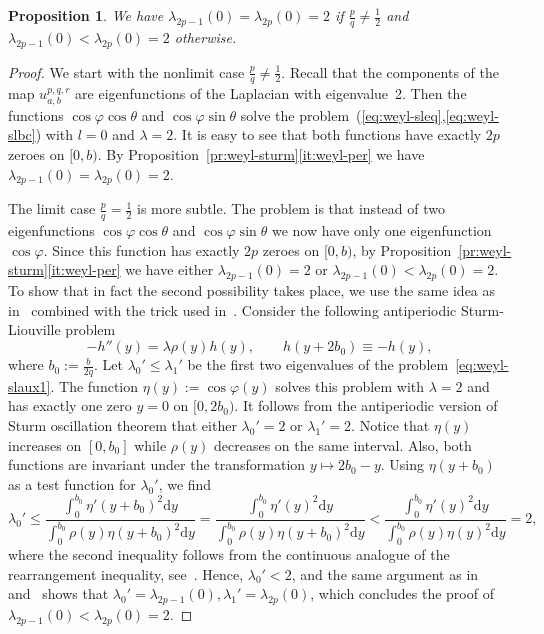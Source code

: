 \documentclass{amsart}
\let\le\leqslant
\let\phi\varphi
\renewcommand{\d}{\mathrm{d}}
\theoremstyle{plain}
\newtheorem{proposition}{Proposition}[section]
\theoremstyle{definition}
\theoremstyle{remark}
\begin{document}
\begin{proposition}\label{pr:weyl-leq0}
We have \(\lambda_{2p-1}(0)=\lambda_{2p}(0)=2\) if \(\frac{p}q\ne\frac{1}2\) and
\(\lambda_{2p-1}(0)<\lambda_{2p}(0)=2\) otherwise.
\end{proposition}

\begin{proof}
We start with the nonlimit case \(\frac{p}q\ne\frac{1}2\). Recall that the
components of the map \(u_{a,b}^{p,q,r}\) are eigenfunctions of the Laplacian
with eigenvalue~2. Then the functions \(\cos\phi\cos\theta\) and
\(\cos\phi\sin\theta\) solve the problem~(\ref{eq:weyl-sleq},\ref{eq:weyl-slbc})
with \(l=0\) and \(\lambda=2\). It is easy to see that both functions have
exactly \(2p\) zeroes on \([0,b)\). By
Proposition~\ref{pr:weyl-sturm}\ref{it:weyl-per} we have
\(\lambda_{2p-1}(0)=\lambda_{2p}(0)=2\).

The limit case \(\frac{p}q=\frac{1}2\) is more subtle. The problem is that
instead of two eigenfunctions \(\cos\phi\cos\theta\) and \(\cos\phi\sin\theta\)
we now have only one eigenfunction \(\cos\phi\). Since this function has exactly
\(2p\) zeroes on \([0,b)\), by Proposition~\ref{pr:weyl-sturm}\ref{it:weyl-per}
we have either \(\lambda_{2p-1}(0)=2\) or
\(\lambda_{2p-1}(0)<\lambda_{2p}(0)=2\). To show that in fact the second
possibility takes place, we use the same idea as in~\cite[sec.~3.3]{Kar2014}
combined with the trick used in~\cite[proof of Proposition~3.12]{Mor2024}.
Consider the following antiperiodic Sturm-Liouville problem
\begin{equation}\label{eq:weyl-slaux1}
-h''(y)=\lambda\rho(y)h(y),\qquad h(y+2b_0)\equiv -h(y),
\end{equation}
where \(b_0:=\frac{b}{2q}\). Let \(\lambda_0'\le\lambda_1'\) be the first two
eigenvalues of the problem~\eqref{eq:weyl-slaux1}. The function
\(\eta(y):=\cos\phi(y)\) solves this problem with \(\lambda=2\) and has exactly
one zero \(y=0\) on \([0,2b_0)\). It follows from the antiperiodic version of
Sturm oscillation theorem that either \(\lambda_0'=2\) or \(\lambda_1'=2\).
Notice that \(\eta(y)\) increases on \([0,b_0]\) while \(\rho(y)\) decreases on
the same interval. Also, both functions are invariant under the transformation
\(y\mapsto 2b_0-y\). Using \(\eta(y+b_0)\) as a test function for
\(\lambda_0'\), we find
\[
\lambda_0'\le
\frac{\int_0^{b_0}\eta'(y+b_0)^2\d y}{\int_0^{b_0}\rho(y)\eta(y+b_0)^2\d y}=
\frac{\int_0^{b_0}\eta'(y)^2\d y}{\int_0^{b_0}\rho(y)\eta(y+b_0)^2\d y}<
\frac{\int_0^{b_0}\eta'(y)^2\d y}{\int_0^{b_0}\rho(y)\eta(y)^2\d y}=2,
\]
where the second inequality follows from the continuous analogue of the
rearrangement inequality, see~\cite[Claim~3.13]{Mor2024}. Hence,
\(\lambda_0'<2\), and the same argument as in~\cite[Proposition~11]{Kar2014}
and~\cite[Proposition~3.15]{Mor2024} shows that
\(\lambda_0'=\lambda_{2p-1}(0),\lambda_1'=\lambda_{2p}(0)\), which concludes the
proof of \(\lambda_{2p-1}(0)<\lambda_{2p}(0)=2\).
\end{proof}
\end{document}
